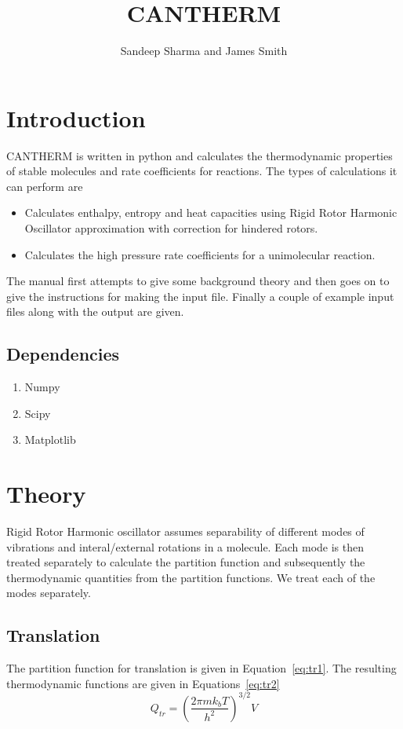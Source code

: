 \documentclass[a4paper,12pt]{article}
\title{CANTHERM}
\author{Sandeep Sharma and James Smith}
\begin{document}
 \maketitle
\tableofcontents
\section{Introduction}
CANTHERM is written in python and calculates the thermodynamic properties of stable molecules and rate coefficients for reactions. The types of calculations it can perform are
\begin{itemize}
 \item Calculates enthalpy, entropy and heat capacities using Rigid Rotor Harmonic Oscillator approximation with correction for hindered rotors.
\item Calculates the high pressure rate coefficients for a unimolecular reaction.
\end{itemize}

The manual first attempts to give some background theory and then goes on to give the instructions for making the input file. Finally a couple of example input files along with the output are given.

\subsection{Dependencies}
\begin{enumerate}
  \item Numpy
  \item Scipy
  \item Matplotlib
\end{enumerate}

\section{Theory}
Rigid Rotor Harmonic oscillator assumes separability of different modes of vibrations and interal/external rotations in a molecule. Each mode is then treated separately to calculate the partition function and subsequently the thermodynamic quantities from the partition functions. We treat each of the modes separately.
\subsection{Translation}
The partition function for translation is given in Equation~\ref{eq:tr1}. The resulting thermodynamic functions are given in Equations~\ref{eq:tr2}
\begin{equation}
 Q_{tr} = \left(\frac{2\pi m k_bT}{h^2}\right)^{3/2}V
\label{eq:tr1}
\end{equation}
\end{document}
